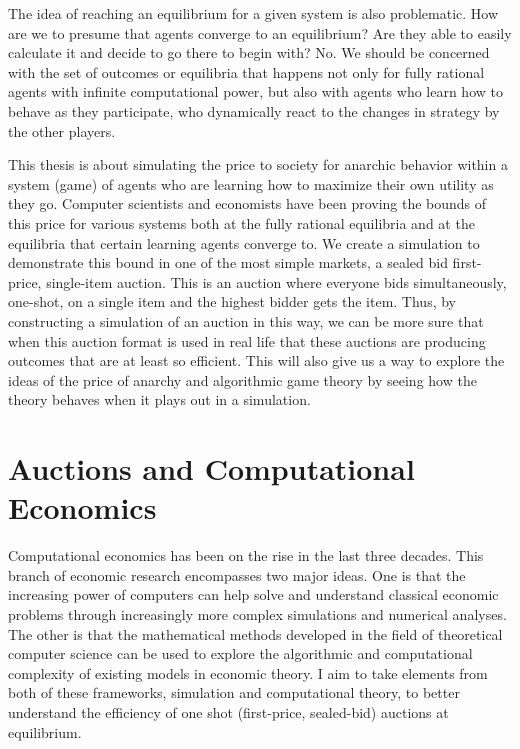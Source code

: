 \documentclass[12pt,twoside]{reedthesis}
\begin{document}
The idea of reaching an equilibrium for a given system is also problematic. How are we to presume that agents converge to an equilibrium? Are they able to easily calculate it and decide to go there to begin with? No. We should be concerned with the set of outcomes or equilibria that happens not only for fully rational agents with infinite computational power, but also with agents who learn how to behave as they participate, who dynamically react to the changes in strategy by the other players. 

This thesis is about simulating the price to society for anarchic behavior within a system (game) of agents who are learning how to maximize their own utility as they go. Computer scientists and economists have been proving the bounds of this price for various systems both at the fully rational equilibria and at the equilibria that certain learning agents converge to. We create a simulation to demonstrate this bound in one of the most simple markets, a sealed bid first-price, single-item auction. This is an auction where everyone bids simultaneously, one-shot, on a single item and the highest bidder gets the item. Thus, by constructing a simulation of an auction in this way, we can be more sure that when this auction format is used in real life that these auctions are producing outcomes that are at least so efficient. This will also give us a way to explore the ideas of the price of anarchy and algorithmic game theory by seeing how the theory behaves when it plays out in a simulation.
	 
	
\chapter{Auctions and Computational Economics}
	Computational economics has been on the rise in the last three decades. This branch of economic research encompasses two major ideas. One is that the increasing power of computers can help solve and understand classical economic problems through increasingly more complex simulations and numerical analyses. The other is that the mathematical methods developed in the field of theoretical computer science can be used to explore the algorithmic and computational complexity of existing models in economic theory. I aim to take elements from both of these frameworks, simulation and computational theory, to better understand the efficiency of one shot (first-price, sealed-bid) auctions at equilibrium. 
\end{document}

